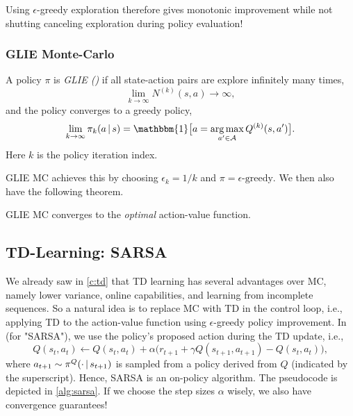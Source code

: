 				Using \(\epsilon\)-greedy exploration therefore gives monotonic improvement while not shutting canceling exploration during policy evaluation!

			\subsubsection{\acs{GLIE} Monte-Carlo}
				\begin{definition}
					A policy \(\pi\) is \emph{\acl{GLIE} ()} if all state-action pairs are explore infinitely many times,
					\begin{equation}
						\lim\limits_{k \to \infty} N^{(k)}(s, a) \to \infty,
					\end{equation}
					and the policy converges to a greedy policy,
					\begin{equation}
						\lim\limits_{k \to \infty} \pi_k(a \given s) = \mathbbm{1}\bigl[ a = \argmax_{a' \in \mathcal{A}} Q^{(k)}(s, a') \bigr].
					\end{equation}
					Here \(k\) is the policy iteration index.
				\end{definition}

				\ac{GLIE} \ac{MC} achieves this by choosing \( \epsilon_k = 1/k \) and \( \pi = \epsilon\text{-greedy} \). We then also have the following theorem.

				\begin{theorem}
					\ac{GLIE} \ac{MC} converges to the \emph{optimal} action-value function.
				\end{theorem}

		\subsection{\acs{TD}-Learning: \acs{SARSA}}
			We already saw in \autoref{c:td} that \ac{TD} learning has several advantages over \ac{MC}, namely lower variance, online capabilities, and learning from incomplete sequences. So a natural idea is to replace \ac{MC} with \ac{TD} in the control loop, i.e., applying \ac{TD} to the action-value function using \(\epsilon\)-greedy policy improvement. In  (for "\acl{SARSA}"), we use the policy's proposed action during the \ac{TD} update, i.e.,
			\begin{equation}
				Q(s_t, a_t) \gets Q(s_t, a_t) + \alpha \bigl( r_{t + 1} + \gamma Q(s_{t + 1}, a_{t + 1}) - Q(s_t, a_t) \bigr),
			\end{equation}
			where \( a_{t + 1} \sim \pi^Q(\cdot \,\vert\, s_{t + 1}) \) is sampled from a policy derived from \(Q\) (indicated by the superscript). Hence, \ac{SARSA} is an on-policy algorithm. The pseudocode is depicted in \autoref{alg:sarsa}. If we choose the step sizes \(\alpha\) wisely, we also have convergence guarantees!

